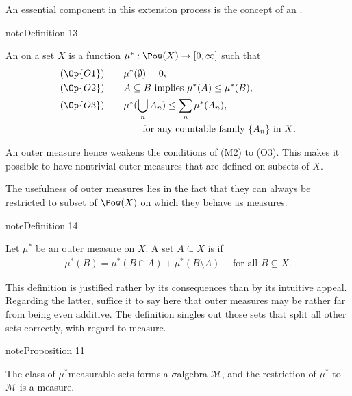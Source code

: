 \documentclass[letterpaper,10pt,english]{jupyterBook}
\begin{document}
\sphinxAtStartPar
An essential component in this extension process is the concept of an .
\label{measure:def-outer-measure}
\begin{sphinxadmonition}{note}{Definition 13}



\sphinxAtStartPar
An  on a set \(X\) is a function \(\mu^*: \Pow(X) \to [0,\infty]\) such that
\begin{align*}
    (\Op{O1}) & \qquad  \mu^*(\emptyset) = 0,\\
    (\Op{O2}) & \qquad  A \subseteq B \text{ implies } \mu^*(A) \leq \mu^*(B), \\
    (\Op{O3}) & \qquad  \mu^*(\bigcup_n A_n) \leq \sum_n \mu^*(A_n), \\
         & \qquad  \qquad \text{for any countable family  $\{A_n\}$ in $X$}.
\end{align*}\end{sphinxadmonition}

\sphinxAtStartPar
An outer measure hence weakens the conditions of  (M2) to  (O3). This makes it possible to have non\sphinxhyphen{}trivial outer measures that are defined on  subsets of \(X\).

\sphinxAtStartPar
The usefulness of outer measures lies in the fact that they can always be restricted to subset of \(\Pow(X)\) on which they behave as measures.
\label{measure:def-measurable}
\begin{sphinxadmonition}{note}{Definition 14}



\sphinxAtStartPar
Let \(\mu^*\) be an outer measure on \(X\). A set \(A \subseteq X\) is  if
\begin{equation*}
\begin{split}
\mu^*(B) = \mu^*(B \cap A) + \mu^*(B \setminus A) \quad \text{ for all $B \subseteq X$}.
\end{split}
\end{equation*}\end{sphinxadmonition}

\sphinxAtStartPar
This definition is justified rather by its consequences than by its intuitive appeal. Regarding the latter, suffice it to say here that outer measures may be rather far from being even  additive. The definition singles out those sets that split all other sets correctly, with regard to measure.
\label{measure:prop-measurable-sets}
\begin{sphinxadmonition}{note}{Proposition 11}



\sphinxAtStartPar
The class of \(\mu^*\)\sphinxhyphen{}measurable sets forms a \(\sigma\)\sphinxhyphen{}algebra \(\mathcal{M}\), and the restriction of \(\mu^*\) to \(\mathcal{M}\) is a measure.
\end{sphinxadmonition}
\end{document}
